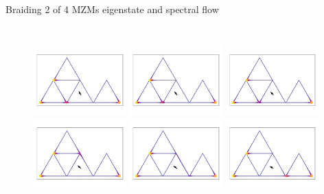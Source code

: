 \documentclass[xcolor=dvipsnames,10pt,aspectratio=169]{beamer}
\begin{document}
  \begin{frame}{Braiding 2 of 4 MZMs eigenstate and spectral flow}
    \begin{columns}
      \begin{figure}
        \includegraphics[width=0.32\textwidth]{./figures/GS-T-0_5236.pdf}
        \includegraphics[width=0.32\textwidth]{./figures/GS-T-0_6283.pdf}
        \includegraphics[width=0.32\textwidth]{./figures/GS-T-0_7330.pdf} \\
        \includegraphics[width=0.32\textwidth]{./figures/GS-T-0_8378.pdf}
        \includegraphics[width=0.32\textwidth]{./figures/GS-T-0_9425.pdf}
        \includegraphics[width=0.32\textwidth]{./figures/GS-T-1_0472.pdf}


\end{figure}
\end{columns}
\end{frame}
\end{document}

